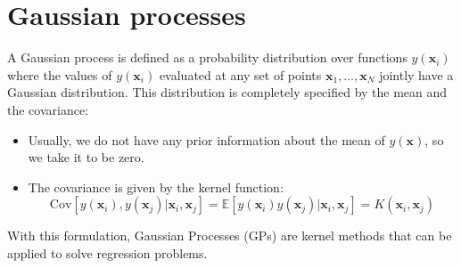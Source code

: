 \section{Gaussian processes}

A Gaussian process is defined as a probability distribution over functions $y(\mathbf{x}_i)$ where the values of $y(\mathbf{x}_i)$ evaluated at any set of points $\mathbf{x}_1,\ldots, \mathbf{x}_N$ jointly have a Gaussian distribution.
This distribution is completely specified by the mean and the covariance:
\begin{itemize}
    \item Usually, we do not have any prior information about the mean of $y(\mathbf{x})$, so we take it to be zero.
    \item The covariance is given by the kernel function:
        \[\text{Cov}[y(\mathbf{x}_i),y(\mathbf{x}_j)|\mathbf{x}_i,\mathbf{x}_j]=\mathbb{E}[y(\mathbf{x}_i)y(\mathbf{x}_j)|\mathbf{x}_i,\mathbf{x}_j]=K(\mathbf{x}_i,\mathbf{x}_j)\]
\end{itemize}
With this formulation, Gaussian Processes (GPs) are kernel methods that can be applied to solve regression problems.

